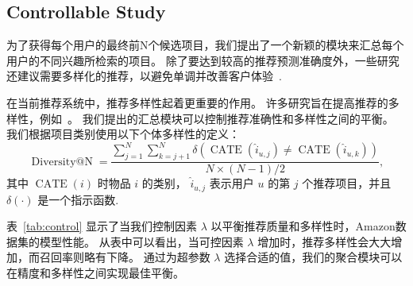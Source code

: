 \subsection{Controllable Study}
\label{sec:control_study}
为了获得每个用户的最终前N个候选项目，我们提出了一个新颖的模块来汇总每个用户的不同兴趣所检索的项目。
除了要达到较高的推荐预测准确度外，一些研究还建议需要多样化的推荐，以避免单调并改善客户体验~\cite{gogna2017balancing,cheng2017learning}. 

在当前推荐系统中，推荐多样性起着更重要的作用。 许多研究旨在提高推荐的多样性，例如~\cite{bradley2001improving,qin2013promoting}。 我们提出的汇总模块可以控制推荐准确性和多样性之间的平衡。 我们根据项目类别使用以下个体多样性的定义：
\begin{equation}
    \operatorname{Diversity@N} = \frac{\sum_{j=1}^N \sum_{k=j+1}^N \delta(\operatorname{CATE}(\hat{i}_{u,j}) \neq \operatorname{CATE}(\hat{i}_{u,k}))}{N \times (N-1) / 2},
\end{equation}
\noindent 其中 $\operatorname{CATE}(i)$ 时物品 $i$ 的类别， $\hat{i}_{u,j}$ 表示用户 $u$ 的第 $j$ 个推荐项目，并且 $\delta(\cdot)$ 是一个指示函数. 

表~\ref{tab:control} 显示了当我们控制因素 $\lambda$ 以平衡推荐质量和多样性时，Amazon数据集的模型性能。 从表中可以看出，当可控因素 $\lambda$ 增加时，推荐多样性会大大增加，而召回率则略有下降。 通过为超参数 $\lambda$ 选择合适的值，我们的聚合模块可以在精度和多样性之间实现最佳平衡。




